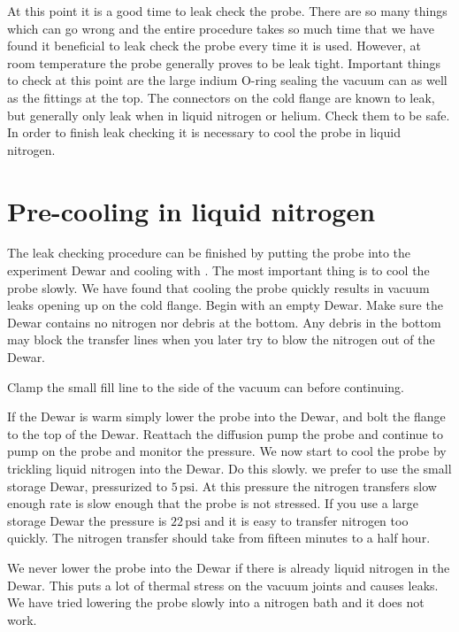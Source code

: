 At this point it is a 
good time to leak check the probe. There are so many things which can go
wrong and the entire procedure takes so much time that we have found it
beneficial to leak check the probe every time it is used. However, at room
temperature the probe generally proves to be leak tight. Important things to
check at this point are the large indium O-ring sealing the vacuum can
as well as the fittings at the top. The connectors on the cold flange are known
to leak, but generally only leak when in liquid nitrogen or helium. 
Check them to be safe. In order to finish leak checking it is necessary to 
cool the probe in liquid nitrogen. 

\section{Pre-cooling in liquid nitrogen}

The leak checking procedure can be finished by putting the probe into the 
experiment Dewar and cooling with \lnit. 
The most important thing is to cool the probe slowly. We have 
found that cooling the probe quickly results in 
vacuum leaks opening up on the cold flange. Begin with an empty Dewar.
Make sure the Dewar contains no nitrogen nor debris 
at the 
bottom. Any debris in the bottom may block the transfer lines when you
later
try to blow the nitrogen out of the Dewar. 

Clamp the small fill line to the side of the vacuum can before continuing.

If the Dewar is warm simply lower the probe into the Dewar, and bolt the 
flange to the top of the Dewar. Reattach the diffusion pump the probe and 
continue to pump on the probe and monitor the pressure. We now start
to cool the probe by trickling liquid nitrogen into the Dewar. Do this slowly.
we prefer to use the small storage Dewar, pressurized to  $5\,\mathrm{psi}$. 
At this pressure
the nitrogen transfers slow enough rate is slow enough that the 
probe is not stressed. If you use a large 
storage Dewar the pressure is $22\,\mathrm{psi}$ 
and it is easy to transfer nitrogen too quickly. 
%
The nitrogen transfer should take from fifteen minutes to a half hour. 

We never lower the probe into the Dewar if there is already liquid nitrogen
in the Dewar. This puts a lot of thermal stress on the vacuum
joints and causes leaks. We have tried lowering the probe slowly into a
nitrogen bath and it does not work. 

